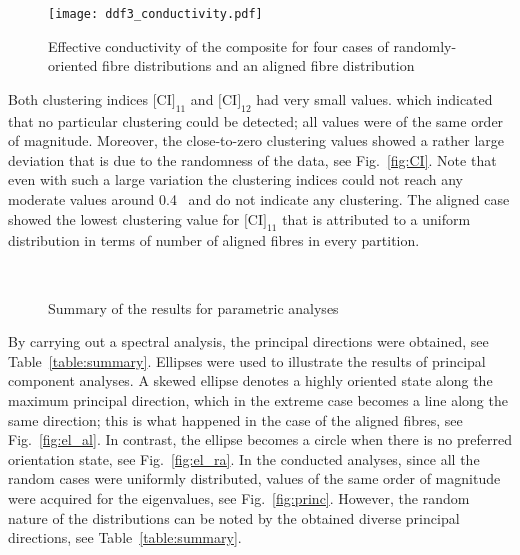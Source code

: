 \begin{figure}[!h]
\centering
\texttt{[image: ddf3\_conductivity.pdf]}
\caption{Effective conductivity of the composite for four cases of randomly-oriented fibre distributions and an aligned fibre distribution}\label{fig:cond}
\end{figure}%

\red
	Both clustering indices ${\text{[CI]}}_{11}$ and ${\text{[CI]}}_{12}$ had very small values. which indicated that no particular clustering could be detected; all values were of the same order of magnitude. Moreover, the close-to-zero clustering values showed a rather large deviation that is due to the randomness of the data, see Fig.~\ref{fig:CI}. Note that even with such a large variation the clustering indices could not reach any moderate values around 0.4~\autocite{Ranganathan.1990} and do not indicate any clustering. The aligned case showed the lowest clustering value for ${\text{[CI]}}_{11}$ that is attributed to a uniform distribution in terms of number of aligned fibres in every partition.\bl
	
	
	
	\begin{figure}[!h]
	\centering
	\\
	\caption{Summary of the results for parametric analyses}\label{figure:sens}
	\end{figure}%
	
	By carrying out a spectral analysis, the principal directions were obtained, see Table~\ref{table:summary}. Ellipses were used to illustrate the results of principal component analyses. A skewed ellipse denotes a highly oriented state along the maximum principal direction, which in the extreme case becomes a line along the same direction; this is what happened in the case of the aligned fibres, see Fig.~\ref{fig:el_al}. In contrast, the ellipse becomes a circle when there is no preferred orientation state, see Fig.~\ref{fig:el_ra}. In the conducted analyses, since all the random cases were uniformly distributed, values of the same order of magnitude were acquired for the eigenvalues, see Fig.~\ref{fig:princ}. However, the random nature of the distributions can be noted by the obtained diverse principal directions, see Table~\ref{table:summary}.
	
